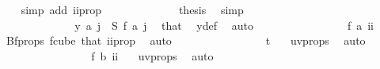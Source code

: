 \begin{isabellebody}
\ {}\ \isamarkupfalse%
\ {\isacharparenleft}{\kern0pt}simp\ add{\isacharcolon}{\kern0pt}\ ii{\isacharunderscore}{\kern0pt}prop{\isacharparenright}{\kern0pt}\isanewline
\ \ \ \ \ \ \ \ \ \ \isamarkupfalse%
\ \isamarkupfalse%
\ {\isacharquery}{\kern0pt}thesis\ \isamarkupfalse%
\ simp\isanewline
\ \ \ \ \ \ \ \ \isamarkupfalse%
\isanewline
\ \ \ \ \ \ \ \ \ \ \isamarkupfalse%
\ {}\isanewline
\ \ \ \ \ \ \ \ \ \ \isamarkupfalse%
\ \isamarkupfalse%
\ {\isachardoublequoteopen}y\ a\ j\ {\isacharequal}{\kern0pt}\ S\ {\isacharparenleft}{\kern0pt}{\isacharquery}{\kern0pt}f\ a{\isacharparenright}{\kern0pt}\ j{\isachardoublequoteclose}\ \isamarkupfalse%
\ that{\isacharparenleft}{\kern0pt}{}{\isacharparenright}{\kern0pt}\ \isamarkupfalse%
\ y{\isacharunderscore}{\kern0pt}def\ \isamarkupfalse%
\ auto\isanewline
\ \ \ \ \ \ \ \ \ \ \isamarkupfalse%
\ \isamarkupfalse%
\ {\isachardoublequoteopen}\ {\isachardot}{\kern0pt}{\isachardot}{\kern0pt}{\isachardot}{\kern0pt}\ {\isacharequal}{\kern0pt}\ {\isacharparenleft}{\kern0pt}{\isacharquery}{\kern0pt}f\ a{\isacharparenright}{\kern0pt}\ ii{\isachardoublequoteclose}\ \isamarkupfalse%
\ Bf{\isacharunderscore}{\kern0pt}props{\isacharparenleft}{\kern0pt}{}{\isacharparenright}{\kern0pt}\ f{\isacharunderscore}{\kern0pt}cube\ that{\isacharparenleft}{\kern0pt}{}{\isacharparenright}{\kern0pt}\ ii{\isacharunderscore}{\kern0pt}prop\ \isamarkupfalse%
\ auto\isanewline
\ \ \ \ \ \ \ \ \ \ \isamarkupfalse%
\ \isamarkupfalse%
\ {\isachardoublequoteopen}\ {\isachardot}{\kern0pt}{\isachardot}{\kern0pt}{\isachardot}{\kern0pt}\ {\isacharequal}{\kern0pt}\ t{\isachardoublequoteclose}\ \isamarkupfalse%
\ {}\ uv{\isacharunderscore}{\kern0pt}props\ \isamarkupfalse%
\ auto\isanewline
\ \ \ \ \ \ \ \ \ \ \isamarkupfalse%
\ \isamarkupfalse%
\ {\isachardoublequoteopen}\ {\isachardot}{\kern0pt}{\isachardot}{\kern0pt}{\isachardot}{\kern0pt}\ {\isacharequal}{\kern0pt}\ {\isacharparenleft}{\kern0pt}{\isacharquery}{\kern0pt}f\ b{\isacharparenright}{\kern0pt}\ ii{\isachardoublequoteclose}\ \isamarkupfalse%
\ {}\ uv{\isacharunderscore}{\kern0pt}props\ \isamarkupfalse%
\ auto\isanewline
\ \ \ \ \ \ \ \ \ \ \isamarkupfalse%

\end{isabellebody}
